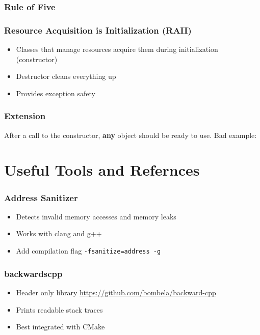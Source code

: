 \documentclass[usenames,dvipsnames,svgnames,table,aspectratio=169]{beamer}
\begin{document}
\begin{frame}
    \frametitle{Rule of Five}
    
\end{frame}


\begin{frame}
    \frametitle{Resource Acquisition is Initialization (RAII)}
    \begin{itemize}
        \item<+-> Classes that manage resources acquire them during initialization (constructor)
        \item<+-> Destructor cleans everything up
        \item<+-> Provides exception safety
    \end{itemize}
    \only<+->{}
\end{frame}

\begin{frame}
    \frametitle{Extension}
    After a call to the constructor, \textbf{any} object should be ready to use. Bad example:
    \pause
    
\end{frame}

\section{Useful Tools and Refernces}
\begin{frame}
    \frametitle{Address Sanitizer}
    \begin{itemize}
        \item<+-> Detects invalid memory accesses and memory leaks
        \item<+-> Works with clang and g++
        \item<+-> Add compilation flag \lstinline{-fsanitize=address -g}
    \end{itemize}
\end{frame}

\begin{frame}
    \frametitle{backwardscpp}
    \begin{itemize}
        \item<+-> Header only library \url{https://github.com/bombela/backward-cpp}
        \item<+-> Prints readable stack traces
        \item<+-> Best integrated with CMake
    \end{itemize}
\end{frame}
\end{document}
